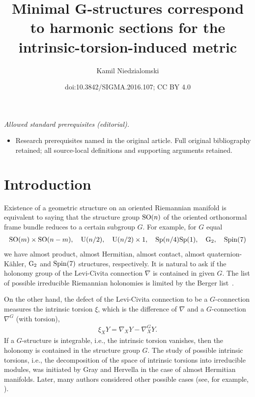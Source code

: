 \documentclass[10pt,a4paper]{amsart}
\title{Minimal G-structures correspond to harmonic sections for the intrinsic-torsion-induced metric}
\author{Kamil Niedzialomski}
\date{doi:10.3842/SIGMA.2016.107; CC BY 4.0}
\numberwithin{equation}{section}
\begin{document}
\maketitle
\noindent\textit{Allowed standard prerequisites (editorial).}\begin{itemize}
\item Research prerequisites named in the original article. Full original bibliography retained; all source-local definitions and supporting arguments retained.
\end{itemize}\medskip
\section{Introduction}

Existence of a geometric structure on an oriented Riemannian manifold is equivalent to saying that the structure group ${\rm SO}(n)$ of the oriented orthonormal frame bundle reduces to a certain subgroup $G$. For example, for $G$ equal
\begin{gather*}
{\rm SO}(m)\times {\rm SO}(n-m),\quad {\rm U}(n/2),\quad {\rm U}(n/2)\times 1,\quad {\rm Sp}(n/4){\rm Sp}(1),\quad {\rm G}_2,\quad {\rm Spin}(7)
\end{gather*}
we have almost product, almost Hermitian, almost contact, almost quaternion-K\"ahler, ${\rm G}_2$ and ${\rm Spin}(7)$ structures, respectively. It is natural to ask if the holonomy group of the Levi-Civita connection $\nabla$ is contained in given $G$. The list of possible irreducible Riemannian holonomies is limited by the Berger list~\cite{lb}.

On the other hand, the defect of the Levi-Civita connection to be a $G$-connection measures the intrinsic torsion $\xi$, which is the dif\/ference of $\nabla$ and a $G$-connection $\nabla^G$ (with torsion),
\begin{gather*}
\xi_XY=\nabla_XY-\nabla^G_XY.
\end{gather*}
If a $G$-structure is integrable, i.e., the intrinsic torsion vanishes, then the holonomy is contained in the structure group $G$. The study of possible intrinsic torsions, i.e., the decomposition of the space of intrinsic torsions into irreducible modules, was initiated by Gray and Hervella \cite{gh} in the case of almost Hermitian manifolds. Later, many authors considered other possible cases (see, for example, \cite{cg,chs,cs,dm,ffs,fg,mc,ms,an,vw}).
\end{document}
